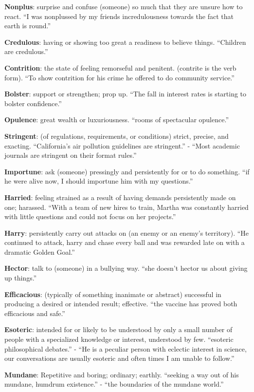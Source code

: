 \documentclass[12pt, a4paper]{ximera}
\begin{document}
\textbf{Nonplus}: surprise and confuse (someone) so much that they are unsure how to react. ``I was nonplussed by my friends incredulousness towards the fact that earth is round.''

\textbf{Credulous}: having or showing too great a readiness to believe things. ``Children are credulous.''

\textbf{Contrition}: the state of feeling remorseful and penitent. (contrite is the verb form). ``To show contrition for his crime he offered to do community service.''

\textbf{Bolster}: support or strengthen; prop up. ``The fall in interest rates is starting to bolster confidence.''
 
\textbf{Opulence}: great wealth or luxuriousness. ``rooms of spectacular opulence.''
 
\textbf{Stringent}: (of regulations, requirements, or conditions) strict, precise, and exacting. ``California's air pollution guidelines are stringent.'' - ``Most academic journals are stringent on their format rules.''

\textbf{Importune}: ask (someone) pressingly and persistently for or to do something. ``if he were alive now, I should importune him with my questions.''

\textbf{Harried}: feeling strained as a result of having demands persistently made on one; harassed. ``With a team of new hires to train, Martha was constantly harried with little questions and could not focus on her projects.''

\textbf{Harry}: persistently carry out attacks on (an enemy or an enemy's territory). ``He continued to attack, harry and chase every ball and was rewarded late on with a dramatic Golden Goal.''

\textbf{Hector}: talk to (someone) in a bullying way. ``she doesn't hector us about giving up things.''

\textbf{Efficacious}: (typically of something inanimate or abstract) successful in producing a desired or intended result; effective. ``the vaccine has proved both efficacious and safe.''

\textbf{Esoteric}: intended for or likely to be understood by only a small number of people with a specialized knowledge or interest, understood by few. ``esoteric philosophical debates.'' - ``He is a peculiar person with eclectic interest in science, our conversations are usually esoteric and often times I am unable to follow.''

\textbf{Mundane}: Repetitive and boring; ordinary; earthly. ``seeking a way out of his mundane, humdrum existence.'' - ``the boundaries of the mundane world.''
\end{document}
